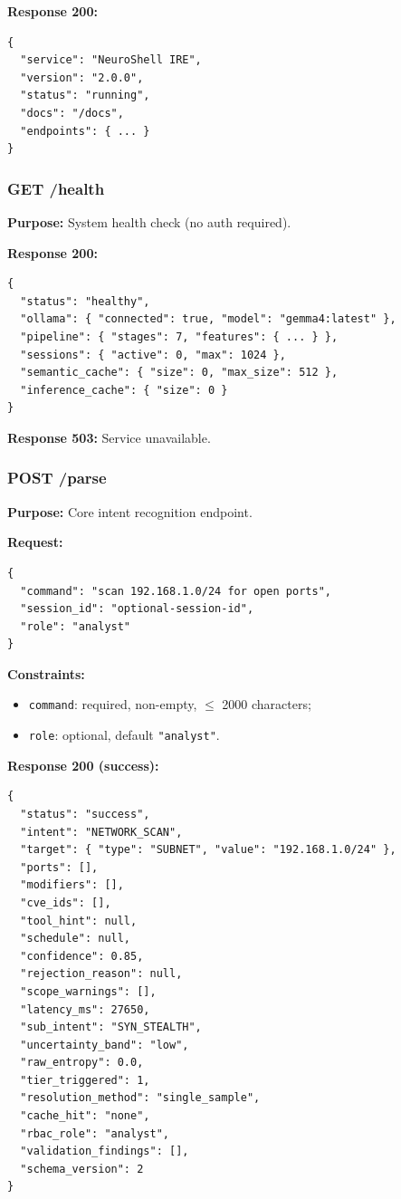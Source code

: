 ﻿\documentclass[10pt,journal,onecolumn]{IEEEtran}
\begin{document}
\textbf{Response 200:}
\begin{lstlisting}
{
  "service": "NeuroShell IRE",
  "version": "2.0.0",
  "status": "running",
  "docs": "/docs",
  "endpoints": { ... }
}
\end{lstlisting}

\subsubsection{GET /health}
\textbf{Purpose:} System health check (no auth required).

\textbf{Response 200:}
\begin{lstlisting}
{
  "status": "healthy",
  "ollama": { "connected": true, "model": "gemma4:latest" },
  "pipeline": { "stages": 7, "features": { ... } },
  "sessions": { "active": 0, "max": 1024 },
  "semantic_cache": { "size": 0, "max_size": 512 },
  "inference_cache": { "size": 0 }
}
\end{lstlisting}

\textbf{Response 503:} Service unavailable.

\subsubsection{POST /parse}
\textbf{Purpose:} Core intent recognition endpoint.

\textbf{Request:}
\begin{lstlisting}
{
  "command": "scan 192.168.1.0/24 for open ports",
  "session_id": "optional-session-id",
  "role": "analyst"
}
\end{lstlisting}

\textbf{Constraints:}
\begin{itemize}
\item \texttt{command}: required, non-empty, $\leq$ 2000 characters;
\item \texttt{role}: optional, default \texttt{"analyst"}.
\end{itemize}

\textbf{Response 200 (success):}
\begin{lstlisting}
{
  "status": "success",
  "intent": "NETWORK_SCAN",
  "target": { "type": "SUBNET", "value": "192.168.1.0/24" },
  "ports": [],
  "modifiers": [],
  "cve_ids": [],
  "tool_hint": null,
  "schedule": null,
  "confidence": 0.85,
  "rejection_reason": null,
  "scope_warnings": [],
  "latency_ms": 27650,
  "sub_intent": "SYN_STEALTH",
  "uncertainty_band": "low",
  "raw_entropy": 0.0,
  "tier_triggered": 1,
  "resolution_method": "single_sample",
  "cache_hit": "none",
  "rbac_role": "analyst",
  "validation_findings": [],
  "schema_version": 2
}
\end{lstlisting}
\end{document}
